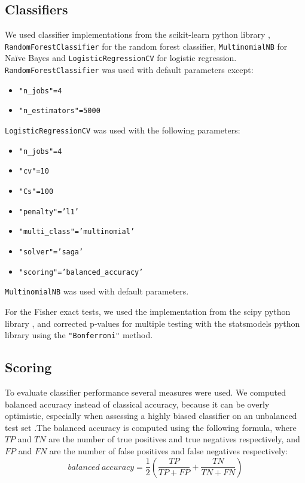 \documentclass[
  11,
]{scrbook}
\providecommand{\tightlist}{%
  \setlength{\itemsep}{0pt}\setlength{\parskip}{0pt}}
\begin{document}
\hypertarget{classifiers}{%
\subsection{Classifiers}\label{classifiers}}

We used classifier implementations from the scikit-learn python library
\autocite{pedregosaScikitlearnMachineLearning2011}, \texttt{RandomForestClassifier} for
the random forest classifier, \texttt{MultinomialNB} for Naïve Bayes and
\texttt{LogisticRegressionCV} for logistic regression.\\
\texttt{RandomForestClassifier} was used with default parameters except:

\begin{itemize}
\tightlist
\item
  \texttt{"n\_jobs"=4}
\item
  \texttt{"n\_estimators"=5000}
\end{itemize}

\texttt{LogisticRegressionCV} was used with the following parameters:

\begin{itemize}
\tightlist
\item
  \texttt{"n\_jobs"=4}
\item
  \texttt{"cv"=10}
\item
  \texttt{"Cs"=100}
\item
  \texttt{"penalty"=’l1’}
\item
  \texttt{"multi\_class"=’multinomial’}
\item
  \texttt{"solver"=’saga’}
\item
  \texttt{"scoring"=’balanced\_accuracy’}
\end{itemize}

\texttt{MultinomialNB} was used with default parameters.

For the Fisher exact tests, we used the implementation from the scipy
python library \autocite{virtanenSciPyFundamentalAlgorithms2020}, and corrected
p-values for multiple testing with the statsmodels python library
\autocite{seaboldStatsmodelsEconometricStatistical2010} using the \texttt{"Bonferroni"}
method.

\hypertarget{scoring}{%
\subsection{Scoring}\label{scoring}}

To evaluate classifier performance several measures were used. We
computed balanced accuracy instead of classical accuracy, because it can
be overly optimistic, especially when assessing a highly biased
classifier on an unbalanced test set
\autocite{brodersenBalancedAccuracyIts2010}.The balanced accuracy is computed
using the following formula, where \(TP\) and \(TN\) are the number of true
positives and true negatives respectively, and \(FP\) and \(FN\) are the
number of false positives and false negatives respectively:\\
\[
balanced~accuracy = \frac{1}{2}\left(
      \frac{TP}{TP + FP} + \frac{TN}{TN + FN}
  \right)
\]
\end{document}
